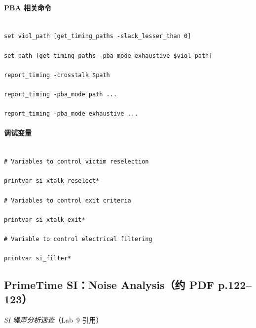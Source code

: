 \paragraph{PBA 相关命令}

\begin{lstlisting}

set viol_path [get_timing_paths -slack_lesser_than 0]

set path [get_timing_paths -pba_mode exhaustive $viol_path]

report_timing -crosstalk $path

report_timing -pba_mode path ...

report_timing -pba_mode exhaustive ...

\end{lstlisting}



\paragraph{调试变量}

\begin{lstlisting}

# Variables to control victim reselection

printvar si_xtalk_reselect*

# Variables to control exit criteria

printvar si_xtalk_exit*

# Variable to control electrical filtering

printvar si_filter*

\end{lstlisting}



\subsection{PrimeTime SI：Noise Analysis（约 PDF p.122--123）}

\label{jobaid:si-noise}



\noindent\textit{SI 噪声分析速查}（Lab~9 引用）




